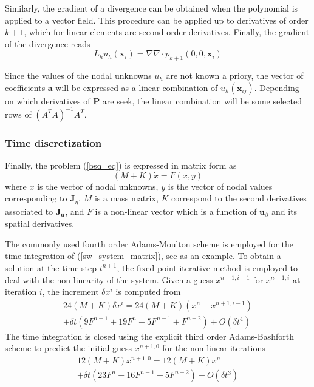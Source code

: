 Similarly, the gradient of a divergence can be obtained when the polynomial is applied to a vector field. This procedure can be applied up to derivatives of order $k+1$, which for linear elements are second-order derivatives. Finally, the gradient of the divergence reads
\begin{equation}
    L_h u_h (\mathbf{x}_i) = \nabla \nabla \cdot p_{k+1} (0,0,\mathbf{x}_i)
\end{equation}

Since the values of the nodal unknowns $u_h$ are not known a priory, the vector of coefficients $\mathbf{a}$ will be expressed as a linear combination of $u_h(\mathbf{x}_{ij})$. Depending on which derivatives of $\mathbf{P}$ are seek, the linear combination will be some selected rows of $(A^T A)^{-1}A^T$.




\subsubsection{Time discretization}

Finally, the problem (\ref{bsq_eq}) is expressed in matrix form as
\begin{equation} \label{sw_system_matrix}
    (M + K) \dot{x} = F(x,y)
\end{equation} 
where $x$ is the vector of nodal unknowns, $y$ is the vector of nodal values corresponding to $\mathbf{J}_\eta$, $M$ is a mass matrix, $K$ correspond to the second derivatives associated to $\mathbf{J}_{\mathbf{u}}$, and $F$ is a non-linear vector which is a function of $\mathbf{u}_\beta$ and its spatial derivatives.



The commonly used fourth order Adams-Moulton scheme is employed for the time integration of (\ref{sw_system_matrix}), see \cite{wei1995,woo2004a,codina2008b} as an example.
To obtain a solution at the time step $t^{n+1}$, the fixed point iterative method is employed to deal with the non-linearity of the system. Given a guess $x^{n+1,i-1}$ for $x^{n+1,i}$ at iteration $i$, the increment $\delta x^i$ is computed from
\begin{multline}
    24 (M + K) \delta x^i = 
    24 (M + K) (x^n - x^{n+1,i-1}) \\
     + \delta t (9F^{n+1} + 19F^n - 5F^{n-1} + F^{n-2}) + O(\delta t^4)
    \label{adams-moulton}
\end{multline}
The time integration is closed using the explicit third order Adams-Bashforth scheme to predict the initial guess $x^{n+1,0}$ for the non-linear iterations
\begin{multline}
    12 (M + K) x^{n+1,0} = 
    12 (M + K) x^n \\
     + \delta t (23F^n - 16F^{n-1} + 5F^{n-2}) + O(\delta t^3)
    \label{adams-bashforth}
\end{multline}

